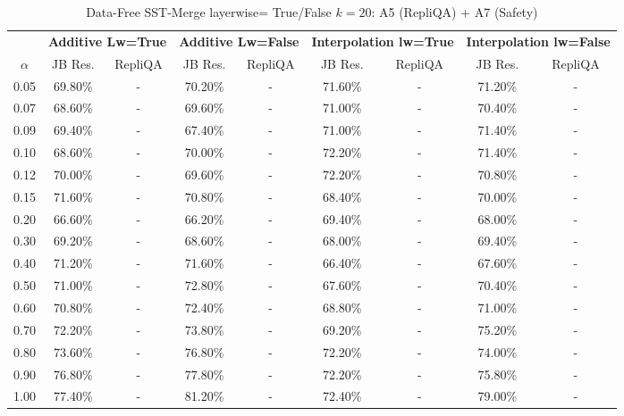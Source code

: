 \begin{table}[h]
\centering
\caption{Data-Free SST-Merge layerwise= True/False $k=20$: A5 (RepliQA) + A7 (Safety)}
\label{tab:res_a5_a7_data_free_sst_20}
\begin{tabular}{c|cc|cc|cc|cc}
\hline
 & \multicolumn{2}{c|}{\textbf{Additive Lw=True}} & \multicolumn{2}{c|}{\textbf{Additive Lw=False}} & \multicolumn{2}{c|}{\textbf{Interpolation lw=True}}& \multicolumn{2}{c}{\textbf{Interpolation lw=False}} \\
$\alpha$ & JB Res. & RepliQA & JB Res. & RepliQA & JB Res. & RepliQA & JB Res. & RepliQA \\
\hline
0.05 & 69.80\% & - & 70.20\% & - & 71.60\% & - & 71.20\% & - \\
0.07 & 68.60\% & - & 69.60\% & - & 71.00\% & - & 70.40\% & - \\
0.09 & 69.40\% & - & 67.40\% & - & 71.00\% & - & 71.40\% & - \\
0.10 & 68.60\% & - & 70.00\% & - & 72.20\% & - & 71.40\% & - \\
0.12 & 70.00\% & - & 69.60\% & - & 72.20\% & - & 70.80\% & - \\
0.15 & 71.60\% & - & 70.80\% & - & 68.40\% & - & 70.00\% & - \\
0.20 & 66.60\% & - & 66.20\% & - & 69.40\% & - & 68.00\% & - \\
0.30 & 69.20\% & - & 68.60\% & - & 68.00\% & - & 69.40\% & - \\
0.40 & 71.20\% & - & 71.60\% & - & 66.40\% & - & 67.60\% & - \\
0.50 & 71.00\% & - & 72.80\% & - & 67.60\% & - & 70.40\% & - \\
0.60 & 70.80\% & - & 72.40\% & - & 68.80\% & - & 71.00\% & - \\
0.70 & 72.20\% & - & 73.80\% & - & 69.20\% & - & 75.20\% & - \\
0.80 & 73.60\% & - & 76.80\% & - & 72.20\% & - & 74.00\% & - \\
0.90 & 76.80\% & - & 77.80\% & - & 72.20\% & - & 75.80\% & - \\
1.00 & 77.40\% & - & 81.20\% & - & 72.40\% & - & 79.00\% & - \\
\hline
\end{tabular}
\end{table}
\FloatBarrier

